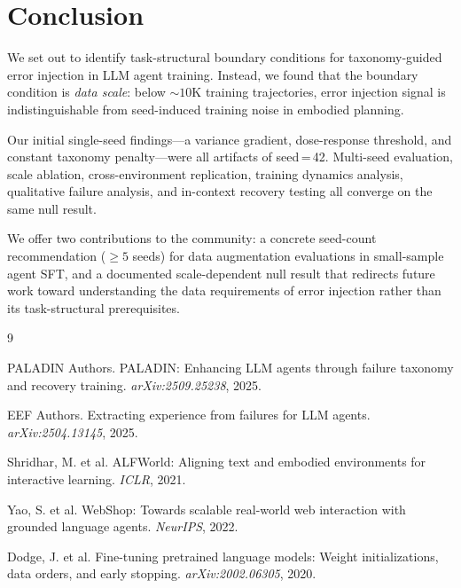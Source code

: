 \documentclass[11pt,a4paper]{article}
\begin{document}
\section{Conclusion}

We set out to identify task-structural boundary conditions for taxonomy-guided error injection in LLM agent training.
Instead, we found that the boundary condition is \emph{data scale}: below ${\sim}10$K training trajectories, error injection signal is indistinguishable from seed-induced training noise in embodied planning.

Our initial single-seed findings---a variance gradient, dose-response threshold, and constant taxonomy penalty---were all artifacts of seed\,=\,42.
Multi-seed evaluation, scale ablation, cross-environment replication, training dynamics analysis, qualitative failure analysis, and in-context recovery testing all converge on the same null result.

We offer two contributions to the community: a concrete seed-count recommendation (${\geq}5$ seeds) for data augmentation evaluations in small-sample agent SFT, and a documented scale-dependent null result that redirects future work toward understanding the data requirements of error injection rather than its task-structural prerequisites.



\begin{thebibliography}{9}

PALADIN Authors.
\newblock PALADIN: Enhancing LLM agents through failure taxonomy and recovery training.
\newblock \emph{arXiv:2509.25238}, 2025.

EEF Authors.
\newblock Extracting experience from failures for LLM agents.
\newblock \emph{arXiv:2504.13145}, 2025.

Shridhar, M. et al.
\newblock ALFWorld: Aligning text and embodied environments for interactive learning.
\newblock \emph{ICLR}, 2021.

Yao, S. et al.
\newblock WebShop: Towards scalable real-world web interaction with grounded language agents.
\newblock \emph{NeurIPS}, 2022.

Dodge, J. et al.
\newblock Fine-tuning pretrained language models: Weight initializations, data orders, and early stopping.
\newblock \emph{arXiv:2002.06305}, 2020.

\end{thebibliography}
\end{document}
